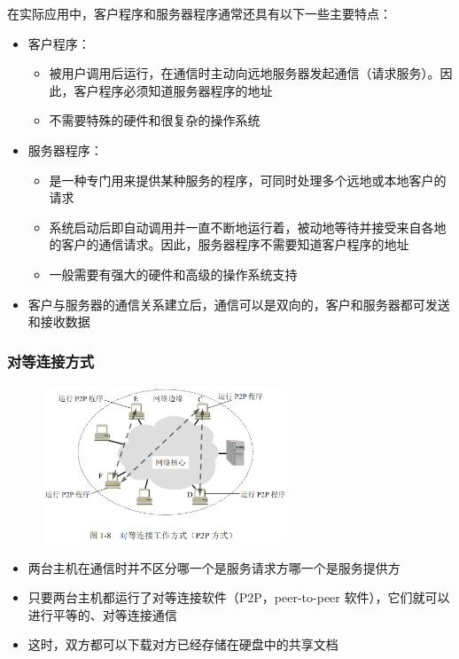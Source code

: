 \documentclass[cs4size,a4paper,10pt]{ctexart}
\begin{document}
	在实际应用中，客户程序和服务器程序通常还具有以下一些主要特点：
	\begin{itemize}
		\item 客户程序：
		\begin{itemize}
			\item 被用户调用后运行，在通信时主动向远地服务器发起通信（请求服务）。因此，客户程序必须知道服务器程序的地址
			\item 不需要特殊的硬件和很复杂的操作系统
		\end{itemize}
		\item 服务器程序：
		\begin{itemize}
			\item 是一种专门用来提供某种服务的程序，可同时处理多个远地或本地客户的请求
			\item 系统启动后即自动调用并一直不断地运行着，被动地等待并接受来自各地的客户的通信请求。因此，服务器程序不需要知道客户程序的地址
			\item 一般需要有强大的硬件和高级的操作系统支持
		\end{itemize}
		\item 客户与服务器的通信关系建立后，通信可以是双向的，客户和服务器都可发送和接收数据
	\end{itemize}

	\subsubsection{对等连接方式}
	\begin{figure}[H]
		\centering
		\includegraphics[width=0.65\textwidth]{img/1.8}
	\end{figure}
	
	\begin{itemize}
		\item 两台主机在通信时并不区分哪一个是服务请求方哪一个是服务提供方
		\item 只要两台主机都运行了对等连接软件（P2P，peer-to-peer 软件），它们就可以进行平等的、对等连接通信
		\item 这时，双方都可以下载对方已经存储在硬盘中的共享文档
	\end{itemize}
\end{document}
